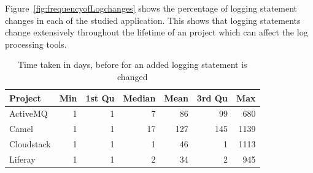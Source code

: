 %
%	


Figure~\ref{fig:frequencyofLogchanges} shows the percentage of logging statement changes in each of the studied application. This shows that logging statements change extensively throughout the lifetime of an project which can affect the log processing tools.

\begin{table}[t]
	\centering
	\smaller
	\caption{Time taken in days, before for an added logging statement is changed}
	
	\begin{tabular}{lrrrrrr}
		\toprule
		\textbf{Project} & \textbf{Min} & \textbf{1st Qu} & \textbf{Median} & \textbf{Mean} & \textbf{3rd Qu} & \textbf{Max} \\
		\midrule
		ActiveMQ   & 1  & 1      & 7     & 86    & 99     & 680  \\
		Camel      & 1   & 1      & 17      & 127    & 145      & 1139 \\
		Cloudstack & 1   & 1      & 1      & 46   & 1     & 1113 \\
		Liferay    & 1   & 1      & 2     & 34    & 2     & 945\\	
		\bottomrule
		
	\end{tabular}
	\label{tba:summaryofnewLogCodechange}
\end{table}


